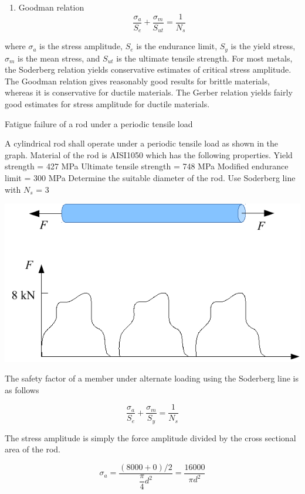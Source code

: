 \documentclass[a4paper,openany,nobib]{tufte-book}
\begin{document}
{{\begin{enumerate}
\item Goodman relation
$$\frac{\sigma_a}{S_e} + \frac{\sigma _m}{S_{ut}} = \frac{1}{N_s}$$
\end{enumerate}

where \(\sigma_a\) is the stress amplitude, \(S_e\) is the endurance limit,
\(S_y\) is the yield stress, \(\sigma_m\) is the mean stress, and \(S_{ut}\)
is the ultimate tensile strength. For most metals, the Soderberg
relation yields conservative estimates of critical stress amplitude. The
Goodman relation gives reasonably good results for brittle materials,
whereas it is conservative for ductile materials. The Gerber relation
yields fairly good estimates for stress amplitude for ductile materials.

Fatigue failure of a rod under a periodic tensile load

A cylindrical rod shall operate under a periodic tensile load as shown
in the graph. Material of the rod is AISI1050 which has the following
properties. Yield strength = 427 MPa Ultimate tensile strength = 748 MPa
Modified endurance limit = 300 MPa Determine the suitable diameter of
the rod. Use Soderberg line with \(N_s\) = 3

\begin{center}
\includegraphics[width=.9\linewidth]{pictures/Failure-theories/fatigue-example.pdf}
\end{center}

The safety factor of a member under alternate loading using the
Soderberg line is as follows

$$\frac{\sigma_a}{S_e} + \frac{\sigma_m}{S_y} = \frac{1}{N_s}$$

The stress amplitude is simply the force amplitude divided by the cross
sectional area of the rod.

$$\sigma_a = \frac{(8000 + 0)/2}{\dfrac{\pi }{4}d^2} = \frac{16000}{\pi d^2}$$

}}
\end{document}

